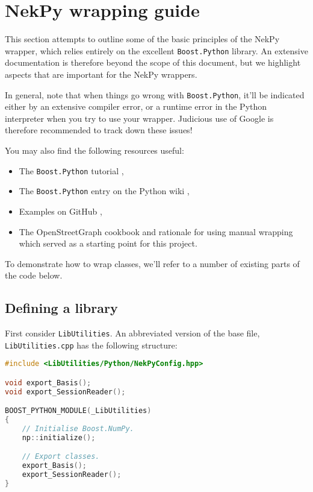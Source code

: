 \chapter{NekPy wrapping guide}

This section attempts to outline some of the basic principles of the NekPy
wrapper, which relies entirely on the excellent \texttt{Boost.Python} library. An
extensive documentation is therefore beyond the scope of this document, but we
highlight aspects that are important for the NekPy wrappers.

In general, note that when things go wrong with \texttt{Boost.Python}, it'll be
indicated either by an extensive compiler error, or a runtime error in the
Python interpreter when you try to use your wrapper. Judicious use of Google is
therefore recommended to track down these issues!

You may also find the following resources useful:
\begin{itemize}
	\item The \texttt{Boost.Python} tutorial \cite{BoostPythonTutorial},
	\item The \texttt{Boost.Python} entry on the Python wiki \cite{BoostPythonWikiEntry},
	\item Examples on GitHub \cite{GitHubExamples},
	\item The OpenStreetGraph cookbook \cite{OpenStreetGraphCookbook} and rationale 
		for using manual wrapping \cite{ManualWrappingRationale} which served as a starting 
		point for this project.
\end{itemize}

To demonstrate how to wrap classes, we'll refer to a number of existing parts of
the code below.

\section{Defining a library}

First consider \texttt{LibUtilities}. An abbreviated version of the base file,
\texttt{LibUtilities.cpp} has the following structure:

\begin{lstlisting}[caption={Defining a library with Boost.Python}, label={lst:defining_a_library}, language=C++]
#include <LibUtilities/Python/NekPyConfig.hpp>

void export_Basis();
void export_SessionReader();

BOOST_PYTHON_MODULE(_LibUtilities)
{
    // Initialise Boost.NumPy.
    np::initialize();

    // Export classes.
    export_Basis();
    export_SessionReader();
}
\end{lstlisting}

